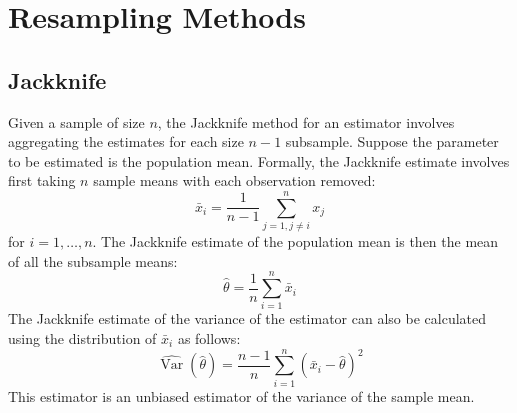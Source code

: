 \documentclass[11pt]{report} %
\begin{document}
\section{Resampling Methods}

\subsection{Jackknife}

Given a sample of size $n$, the Jackknife method for an estimator involves aggregating the estimates for each size $n - 1$ subsample. Suppose the parameter to be estimated is the population mean. Formally, the Jackknife estimate involves first taking $n$ sample means with each observation removed:
\begin{equation}
\bar{x}_{i} = \dfrac{1}{n - 1}\sum_{j = 1, j\neq i}^{n}x_{j}
\end{equation}
for $i = 1, \dots, n$. The Jackknife estimate of the population mean is then the mean of all the subsample means:
\begin{equation}
\hat{\theta} = \dfrac{1}{n}\sum_{i = 1}^{n}\bar{x}_{i}
\end{equation}
The Jackknife estimate of the variance of the estimator can also be calculated using the distribution of $\bar{x}_{i}$ as follows:
\begin{equation}
\hat{\operatorname{Var}}\left(\hat{\theta}\right) = \dfrac{n - 1}{n}\sum_{i = 1}^{n}\left(\bar{x}_{i} - \hat{\theta}\right)^{2}
\end{equation}
This estimator is an unbiased estimator of the variance of the sample mean.
\end{document}
